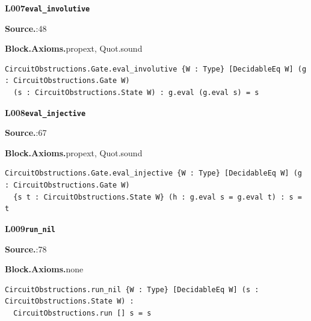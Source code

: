 \par\medskip\noindent\begin{minipage}{\textwidth}
{\small\bfseries L007\enspace\texttt{eval\_involutive}\par}
{\footnotesize\raggedright\textbf{Source.}\enspace{}:48\par
\textbf{Block.}\quad\textbf{Axioms.}\enspace propext, Quot.sound\par}\nopagebreak
\begin{lstlisting}
CircuitObstructions.Gate.eval_involutive {W : Type} [DecidableEq W] (g : CircuitObstructions.Gate W)
  (s : CircuitObstructions.State W) : g.eval (g.eval s) = s
\end{lstlisting}
\end{minipage}\par

\par\medskip\noindent\begin{minipage}{\textwidth}
{\small\bfseries L008\enspace\texttt{eval\_injective}\par}
{\footnotesize\raggedright\textbf{Source.}\enspace{}:67\par
\textbf{Block.}\quad\textbf{Axioms.}\enspace propext, Quot.sound\par}\nopagebreak
\begin{lstlisting}
CircuitObstructions.Gate.eval_injective {W : Type} [DecidableEq W] (g : CircuitObstructions.Gate W)
  {s t : CircuitObstructions.State W} (h : g.eval s = g.eval t) : s = t
\end{lstlisting}
\end{minipage}\par

\par\medskip\noindent\begin{minipage}{\textwidth}
{\small\bfseries L009\enspace\texttt{run\_nil}\par}
{\footnotesize\raggedright\textbf{Source.}\enspace{}:78\par
\textbf{Block.}\quad\textbf{Axioms.}\enspace none\par}\nopagebreak
\begin{lstlisting}
CircuitObstructions.run_nil {W : Type} [DecidableEq W] (s : CircuitObstructions.State W) :
  CircuitObstructions.run [] s = s
\end{lstlisting}
\end{minipage}\par

